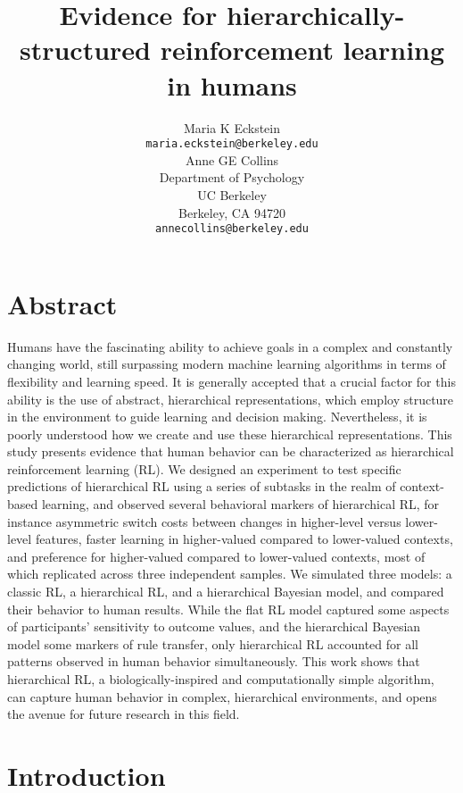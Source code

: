 \documentclass[10pt,letterpaper]{article}  %
\title{Evidence for hierarchically-structured reinforcement learning in humans}
\author{
  Maria K Eckstein \\
  \texttt{maria.eckstein@berkeley.edu} \\  
  \And
  Anne GE Collins \\
  Department of Psychology \\
  UC Berkeley \\
  Berkeley, CA 94720 \\
  \texttt{annecollins@berkeley.edu} \\
}
\newcommand{\rev}{\color{black}}
\begin{document}
\maketitle

\section*{Abstract}
Humans have the fascinating ability to achieve goals in a complex and constantly changing world, still surpassing modern machine learning algorithms in terms of flexibility and learning speed. It is generally accepted that a crucial factor for this ability is the use of abstract, hierarchical representations, which employ structure in the environment to guide learning and decision making. Nevertheless, it is poorly understood how we create and use these hierarchical representations. This study presents evidence that human behavior can be characterized as hierarchical reinforcement learning (RL). We designed an experiment to test specific predictions of hierarchical RL using a series of subtasks in the realm of context-based learning, and observed several behavioral markers of hierarchical RL, for instance asymmetric switch costs between changes in higher-level versus lower-level features, faster learning in higher-valued compared to lower-valued contexts, and preference for higher-valued compared to lower-valued contexts, most of which replicated across three independent samples. We simulated three models: a classic RL, a hierarchical RL, and a hierarchical Bayesian model, and compared their behavior to human results. {\rev While the flat RL model captured some aspects of participants' sensitivity to outcome values, and the hierarchical Bayesian model some markers of rule transfer, only hierarchical RL accounted for all patterns observed in human behavior simultaneously}. This work shows that hierarchical RL, a biologically-inspired and computationally {\rev simple} algorithm, can capture human behavior in complex, hierarchical environments, and opens the avenue for future research in this field.

\newpage
\section*{Introduction}
\end{document}
